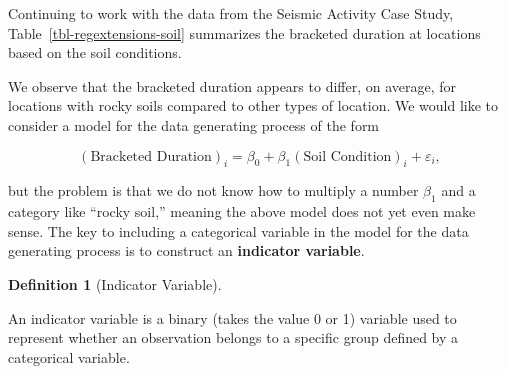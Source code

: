 \documentclass[
  letterpaper,
  DIV=11,
  numbers=noendperiod]{scrreprt}
\theoremstyle{plain}
\theoremstyle{definition}
\theoremstyle{definition}
\newtheorem{definition}{Definition}[chapter]
\theoremstyle{remark}
\begin{document}
Continuing to work with the data from the Seismic Activity Case Study,
Table~\ref{tbl-regextensions-soil} summarizes the bracketed duration at
locations based on the soil conditions.

\begin{table}

\caption{\label{tbl-regextensions-soil}Numerical summaries of the
bracketed duration for locations based on their soil conditions.}


\end{table}%

We observe that the bracketed duration appears to differ, on average,
for locations with rocky soils compared to other types of location. We
would like to consider a model for the data generating process of the
form

\[(\text{Bracketed Duration})_i = \beta_0 + \beta_1 (\text{Soil Condition})_i + \varepsilon_i,\]

but the problem is that we do not know how to multiply a number
\(\beta_1\) and a category like ``rocky soil,'' meaning the above model
does not yet even make sense. The key to including a categorical
variable in the model for the data generating process is to construct an
\textbf{indicator variable}.

\begin{definition}[Indicator
Variable]\protect\hypertarget{def-indicator-variable}{}\label{def-indicator-variable}

An indicator variable is a binary (takes the value 0 or 1) variable used
to represent whether an observation belongs to a specific group defined
by a categorical variable.

\end{definition}
\end{document}
